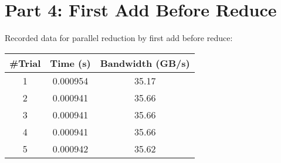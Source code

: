 \section{Part 4: First Add Before Reduce}
\label{sec:part4}

Recorded data for parallel reduction by first add before reduce:

\begin{center}
	\begin{tabular}{||c c c||} 
		\hline
		\#Trial & Time (s) & Bandwidth (GB/s) \\ [0.5ex] 
		\hline\hline
		1 & 0.000954 & 35.17 \\ 
		\hline
		2 & 0.000941 & 35.66 \\
		\hline
		3 & 0.000941 & 35.66 \\
		\hline
		4 & 0.000941 & 35.66 \\
		\hline
		5 & 0.000942 & 35.62 \\
		\hline
	\end{tabular}
\end{center}
